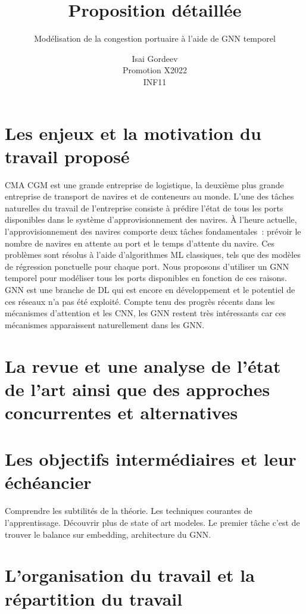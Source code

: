 \documentclass[a4paper,12pt]{article}
\title{Proposition détaillée}
\subtitle{Modélisation de la congestion portuaire à l’aide de GNN temporel}
\author{Isai Gordeev\\
Promotion X2022\\INF11}
\begin{document}
\maketitle



\tableofcontents

\newpage

\section{Les enjeux et la motivation du travail proposé}

CMA CGM est une grande entreprise de logistique, la deuxième plus grande entreprise de transport de navires et de conteneurs au monde. L’une des tâches naturelles du travail de l’entreprise consiste à prédire l’état de tous les ports disponibles dans le système d’approvisionnement des navires. À l'heure actuelle, l'approvisionnement des navires comporte deux tâches fondamentales : prévoir le nombre de navires en attente au port et le temps d'attente du navire. Ces problèmes sont résolus à l'aide d'algorithmes ML classiques, tels que des modèles de régression ponctuelle pour chaque port. Nous proposons d'utiliser un GNN temporel pour modéliser tous les ports disponibles en fonction de ces raisons. GNN est une branche de DL qui est encore en développement et le potentiel de ces réseaux n'a pas été exploité. Compte tenu des progrès récents dans les mécanismes d’attention et les CNN, les GNN restent très intéressants car ces mécanismes apparaissent naturellement dans les GNN.

\section{La revue et une analyse de l’état de l’art ainsi que des approches concurrentes et alternatives}





\section{Les objectifs intermédiaires et leur échéancier}

Comprendre les subtilités de la théorie.
Les techniques courantes de l'apprentissage. 
Découvrir plus de state of art modeles. 
Le premier tâche c'est de trouver le balance sur embedding, architecture du GNN. 


\section{L’organisation du travail et la répartition du travail}
\end{document}
